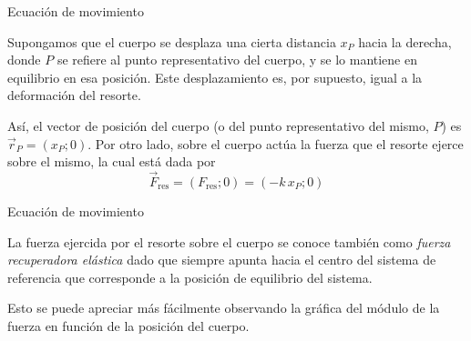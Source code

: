 \documentclass[11pt,handout,aspectratio=1610]{beamer}
\begin{document}
\begin{frame}{Ecuación de movimiento}

    Supongamos que el cuerpo se desplaza una cierta distancia $x_P$ hacia la derecha, donde $P$ se refiere al punto representativo del cuerpo, y se lo mantiene en equilibrio en esa posición. Este desplazamiento es, por supuesto, igual a la deformación del resorte.

    \begin{center}
    \end{center} Así, el vector de posición del cuerpo (o del punto representativo del mismo, $P$) es $\vec{r}_P = \left(x_P; 0\right)$. Por otro lado, sobre el cuerpo actúa la fuerza que el resorte ejerce sobre el mismo, la cual está dada por $$\vec{F}_\text{res} = \left(F_\text{res}; 0\right) = \left(- k\, x_P; 0\right)$$

\end{frame}

\begin{frame}{Ecuación de movimiento}

    La fuerza ejercida por el resorte sobre el cuerpo se conoce también como \emph{fuerza recuperadora elástica} dado que siempre apunta hacia el centro del sistema de referencia que corresponde a la posición de equilibrio del sistema.
    
    \vspace{11pt}

    Esto se puede apreciar más fácilmente observando la gráfica del módulo de la fuerza en función de la posición del cuerpo.

\end{frame}
\end{document}
